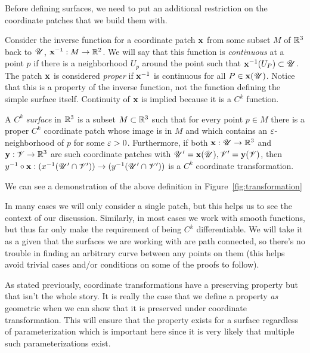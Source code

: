   Before defining surfaces, we need to put an additional restriction on the coordinate patches that we build them with.

  Consider the inverse function for a coordinate patch $\mathbf{x}$ from some subset $M$ of $\mathbb{R}^3$ back to $\mathscr{U}$, $\mathbf{x}^{-1}: M \to \mathbb{R}^2$. We will say that this function is \emph{continuous} at a point $p$ if there is a neighborhood $U_p$ around the point such that $\mathbf{x}^{-1}(U_P)\subset \mathscr{U}$. The patch $\mathbf{x}$ is considered \emph{proper} if $\mathbf{x}^{-1}$ is continuous for all $P \in \mathbf{x}(\mathscr{U})$. Notice that this is a property of the inverse function, not the function defining the simple surface itself. Continuity of $\mathbf{x}$ is implied because it is a $C^k$ function.

  \begin{defn} %
    \label{def:surface}
    A $C^k$ \emph{surface} in $\mathbb{R}^3$ is a subset $M \subset \mathbb{R}^3$ such that for every point $p \in M$ there is a proper $C^k$ coordinate patch whose image is in $M$ and which contains an $\varepsilon$-neighborhood of $p$ for some $\varepsilon > 0$. Furthermore, if both $\mathbf{x}: \mathscr{U} \to \mathbb{R}^3$ and $\mathbf{y}: \mathscr{V} \to \mathbb{R}^3$ are such coordinate patches with $\mathscr{U}^\prime = \mathbf{x}(\mathscr{U}), \mathscr{V}^\prime = \mathbf{y}(\mathscr{V})$, then $y^{-1} \circ \mathbf{x}: (x^{-1}(\mathscr{U}^\prime \cap \mathscr{V}^\prime)) \to (y^{-1}(\mathscr{U}^\prime \cap \mathscr{V}^\prime))$ is a $C^k$ coordinate transformation.
  \end{defn}

  We can see a demonstration of the above definition in Figure~\ref{fig:transformation}

  In many cases we will only consider a single patch, but this helps us to see the context of our discussion. Similarly, in most cases we work with smooth functions, but thus far only make the requirement of being $C^k$ differentiable. We will take it as a given that the surfaces we are working with are path connected, so there's no trouble in finding an arbitrary curve between any points on them (this helps avoid trivial cases and/or conditions on some of the proofs to follow). 

  As stated previously, coordinate transformations have a preserving property but that isn't the whole story. It is really the case that we define a property \emph{as} geometric when we can show that it is preserved under coordinate transformation. This will ensure that the property exists for a surface regardless of parameterization which is important here since it is very likely that multiple such parameterizations exist.

